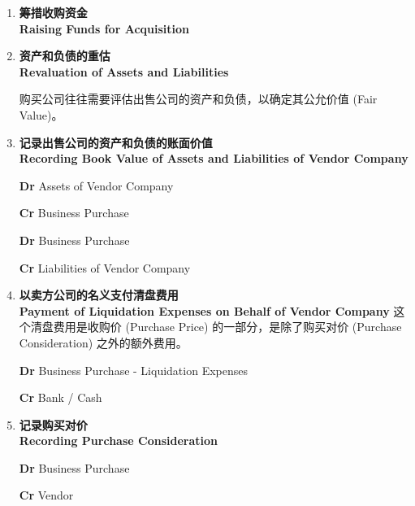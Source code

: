 \documentclass{article}
\begin{document}
\begin{enumerate}

    \item \textbf{筹措收购资金\\Raising Funds for Acquisition}

    \item \textbf{资产和负债的重估\\Revaluation of Assets and Liabilities}
    
    购买公司往往需要评估出售公司的资产和负债，以确定其公允价值 (Fair Value)。

    \item \textbf{记录出售公司的资产和负债的账面价值\\Recording Book Value of Assets and Liabilities of Vendor Company}
    \begin{mdframed}[backgroundcolor=gray!10]
    \textbf{Dr} Assets of Vendor Company

    \hspace{1.7em}\textbf{Cr} Business Purchase
    \end{mdframed}
    \begin{mdframed}[backgroundcolor=gray!10]
    \textbf{Dr} Business Purchase

    \hspace{1.7em}\textbf{Cr} Liabilities of Vendor Company
    \end{mdframed}

    \item \textbf{以卖方公司的名义支付清盘费用\\Payment of Liquidation Expenses on Behalf of Vendor Company}
    这个清盘费用是收购价 (Purchase Price) 的一部分，是除了购买对价 (Purchase Consideration) 之外的额外费用。
    \begin{mdframed}[backgroundcolor=gray!10]
    \textbf{Dr} Business Purchase - Liquidation Expenses

    \hspace{1.7em}\textbf{Cr} Bank / Cash
    \end{mdframed}

    \item \textbf{记录购买对价\\Recording Purchase Consideration}
    
    \begin{mdframed}[backgroundcolor=gray!10]
    \textbf{Dr} Business Purchase

    \hspace{1.7em}\textbf{Cr} Vendor 
    \end{mdframed}


\end{enumerate}
\end{document}
